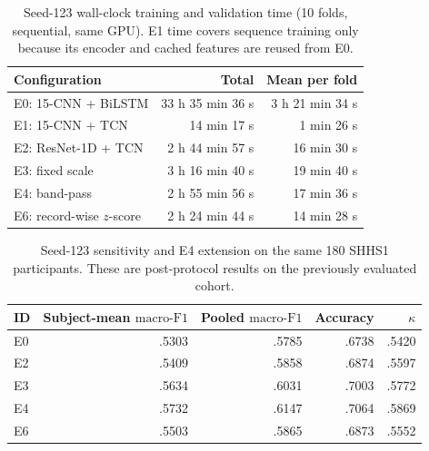 \documentclass[10pt,a4paper]{article}
\newcommand{\mf}{\ensuremath{\mathrm{macro\text{-}F1}}}
\begin{document}
\begin{table}[H]
\centering\small
\caption{Seed-123 wall-clock training and validation time (10 folds, sequential, same GPU).
E1 time covers sequence training only because its encoder and cached features are reused from E0.}
\label{tab:sup_seed123_runtime}
\begin{tabular}{lrr}
\toprule
Configuration & Total & Mean per fold \\
\midrule
E0: 15-CNN + BiLSTM & 33 h 35 min 36 s & 3 h 21 min 34 s \\
E1: 15-CNN + TCN & 14 min 17 s & 1 min 26 s \\
E2: ResNet-1D + TCN & 2 h 44 min 57 s & 16 min 30 s \\
E3: fixed scale & 3 h 16 min 40 s & 19 min 40 s \\
E4: band-pass & 2 h 55 min 56 s & 17 min 36 s \\
E6: record-wise $z$-score & 2 h 24 min 44 s & 14 min 28 s \\
\bottomrule
\end{tabular}
\end{table}

\begin{table}[H]
\centering\small
\caption{Seed-123 sensitivity and E4 extension on the same 180 SHHS1 participants.
These are post-protocol results on the previously evaluated cohort.}
\label{tab:sup_shhs_seed123}
\begin{tabular}{lrrrr}
\toprule
ID & Subject-mean \mf & Pooled \mf & Accuracy & $\kappa$ \\
\midrule
E0 & .5303 & .5785 & .6738 & .5420 \\
E2 & .5409 & .5858 & .6874 & .5597 \\
E3 & .5634 & .6031 & .7003 & .5772 \\
E4 & .5732 & .6147 & .7064 & .5869 \\
E6 & .5503 & .5865 & .6873 & .5552 \\
\bottomrule
\end{tabular}
\end{table}
\end{document}
